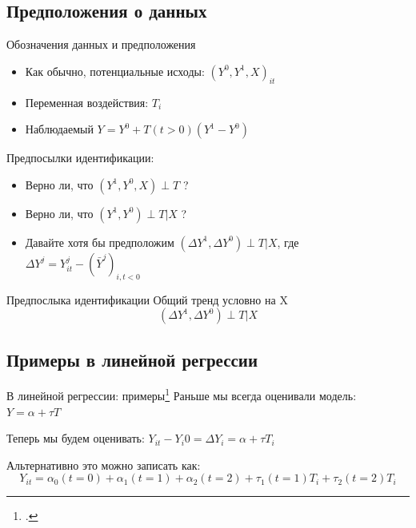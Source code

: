 \subsection{Предположения о данных}

\begin{frame}{Обозначения данных и предположения}
    \begin{itemize}
        \item Как обычно, потенциальные исходы: $(Y^0, Y^1, X)_{it}$
        \item Переменная воздействия: $T_{i}$
        \item Наблюдаемый $Y = Y^0 + T (t > 0) (Y^1 - Y^0)$
    \end{itemize}
    \pause
    Предпосылки идентификации:
    \begin{itemize}[<+->]
        \item Верно ли, что $(Y^1, Y^0, X) \perp T$ ?
        \item Верно ли, что $(Y^1, Y^0) \perp T | X$ ?
        \item Давайте хотя бы предположим $(\Delta Y^1, \Delta Y^0) \perp T | X$, где
        $\Delta Y^j = Y^j_{it} - (\bar Y^j)_{i, t < 0}$

    \end{itemize}
\end{frame}

\begin{frame}{Предпослыка идентификации}
    Общий тренд условно на X
    $$(\Delta Y^1, \Delta Y^0) \perp T | X$$
\end{frame}


\subsection{Примеры в линейной регрессии}


\begin{frame}{В линейной регрессии: примеры\footcitetext[Разделы 5.1, 5.2]{angrist2008mostly}}
    Раньше мы всегда оценивали модель: $Y = \alpha + \tau T$
    
    Теперь мы будем оценивать: $Y_{it} - Y_i0 = \Delta Y_i = \alpha + \tau T_i$
    
    Альтернативно это можно записать как: 
    $$Y_{it} = \alpha_0 (t=0) + \alpha_1  (t=1) + \alpha_2 (t=2) + \tau_1 (t=1) T_{i} + \tau_2 (t=2) T_{i}$$
    
\end{frame}


    
